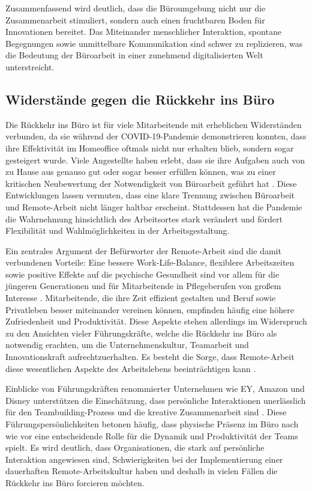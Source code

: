 Zusammenfassend wird deutlich, dass die Büroumgebung nicht nur die Zusammenarbeit stimuliert, sondern auch einen fruchtbaren Boden für Innovationen bereitet. Das Miteinander menschlicher Interaktion, spontane Begegnungen sowie unmittelbare Kommunikation sind schwer zu replizieren, was die Bedeutung der Büroarbeit in einer zunehmend digitalisierten Welt unterstreicht.

\subsection{Widerstände gegen die Rückkehr ins Büro}

Die Rückkehr ins Büro ist für viele Mitarbeitende mit erheblichen Widerständen verbunden, da sie während der COVID-19-Pandemie demonstrieren konnten, dass ihre Effektivität im Homeoffice oftmals nicht nur erhalten blieb, sondern sogar gesteigert wurde. Viele Angestellte haben erlebt, dass sie ihre Aufgaben auch von zu Hause aus genauso gut oder sogar besser erfüllen können, was zu einer kritischen Neubewertung der Notwendigkeit von Büroarbeit geführt hat \cite{file4}. Diese Entwicklungen lassen vermuten, dass eine klare Trennung zwischen Büroarbeit und Remote-Arbeit nicht länger haltbar erscheint. Stattdessen hat die Pandemie die Wahrnehmung hinsichtlich des Arbeitsortes stark verändert und fördert Flexibilität und Wahlmöglichkeiten in der Arbeitsgestaltung.

Ein zentrales Argument der Befürworter der Remote-Arbeit sind die damit verbundenen Vorteile: Eine bessere Work-Life-Balance, flexiblere Arbeitszeiten sowie positive Effekte auf die psychische Gesundheit sind vor allem für die jüngeren Generationen und für Mitarbeitende in Pflegeberufen von großem Interesse \cite{file4}. Mitarbeitende, die ihre Zeit effizient gestalten und Beruf sowie Privatleben besser miteinander vereinen können, empfinden häufig eine höhere Zufriedenheit und Produktivität. Diese Aspekte stehen allerdings im Widerspruch zu den Ansichten vieler Führungskräfte, welche die Rückkehr ins Büro als notwendig erachten, um die Unternehmenskultur, Teamarbeit und Innovationskraft aufrechtzuerhalten. Es besteht die Sorge, dass Remote-Arbeit diese wesentlichen Aspekte des Arbeitslebens beeinträchtigen kann \cite{file4}.

Einblicke von Führungskräften renommierter Unternehmen wie EY, Amazon und Disney unterstützen die Einschätzung, dass persönliche Interaktionen unerlässlich für den Teambuilding-Prozess und die kreative Zusammenarbeit sind \cite{file4}. Diese Führungspersönlichkeiten betonen häufig, dass physische Präsenz im Büro nach wie vor eine entscheidende Rolle für die Dynamik und Produktivität der Teams spielt. Es wird deutlich, dass Organisationen, die stark auf persönliche Interaktion angewiesen sind, Schwierigkeiten bei der Implementierung einer dauerhaften Remote-Arbeitskultur haben und deshalb in vielen Fällen die Rückkehr ins Büro forcieren möchten.

